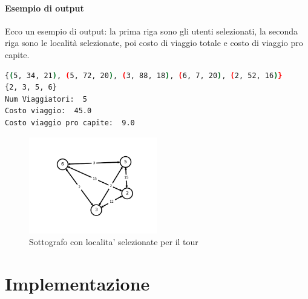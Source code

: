 \documentclass{article}
\begin{document}
\paragraph*{Esempio di output}
Ecco un esempio di output: la prima riga sono gli utenti selezionati, la seconda riga sono le località selezionate, poi costo di viaggio totale e costo di viaggio pro capite. 
\begin{lstlisting}[language=bash]
{(5, 34, 21), (5, 72, 20), (3, 88, 18), (6, 7, 20), (2, 52, 16)}
{2, 3, 5, 6}
Num Viaggiatori:  5
Costo viaggio:  45.0
Costo viaggio pro capite:  9.0
\end{lstlisting}

\begin{figure}[h]
  \centering
  \includegraphics[width=0.50\textwidth]{img/graphOutput.png}
  \caption{Sottografo con localita' selezionate per il tour}\label{fig:graphOutput.png}
\end{figure}

\paragraph*{}
\clearpage
\pagebreak
\section*{Implementazione}

\end{document}
